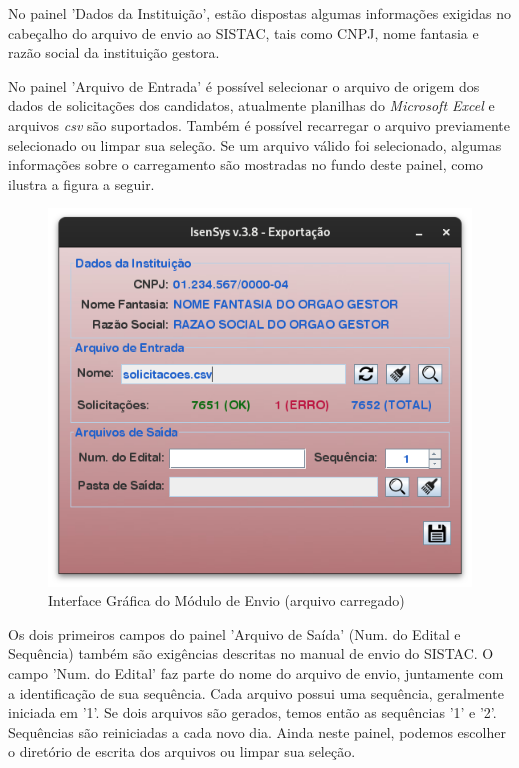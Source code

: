 \documentclass[
	12pt,			%
	openright,		%
	oneside,	
	a4paper,		%
	english,		%
	brazil			%
]{abntex2/abntex2}  %
\begin{document}
	No painel 'Dados da Instituição', estão dispostas algumas informações exigidas no cabeçalho do arquivo de envio ao SISTAC, tais como CNPJ, nome fantasia e razão social da instituição gestora.
	
	No painel 'Arquivo de Entrada' é possível selecionar o arquivo de origem dos dados de solicitações dos candidatos, atualmente planilhas do \textit{Microsoft Excel} e arquivos \textit{csv} são suportados. Também é possível recarregar o arquivo previamente selecionado ou limpar sua seleção. Se um arquivo válido foi selecionado, algumas informações sobre o carregamento são mostradas no fundo deste painel, como ilustra a figura a seguir.
	
	\begin{figure}[H]
		\begin{center}
			
			\caption{Interface Gráfica do Módulo de Envio (arquivo carregado)}
			\label{envio-ui-loaded}
			
			\includegraphics[scale=0.5]{img/envio-ui-loaded}
			
		\end{center}
	\end{figure}
	
	Os dois primeiros campos do painel 'Arquivo de Saída' (Num. do Edital e Sequência) também são exigências descritas no manual de envio do SISTAC. O campo 'Num. do Edital' faz parte do nome do arquivo de envio, juntamente com a identificação de sua sequência. Cada arquivo possui uma sequência, geralmente iniciada em '1'. Se dois arquivos são gerados, temos então as sequências '1' e '2'. Sequências são reiniciadas a cada novo dia. Ainda neste painel, podemos escolher o diretório de escrita dos arquivos ou limpar sua seleção.
\end{document}
